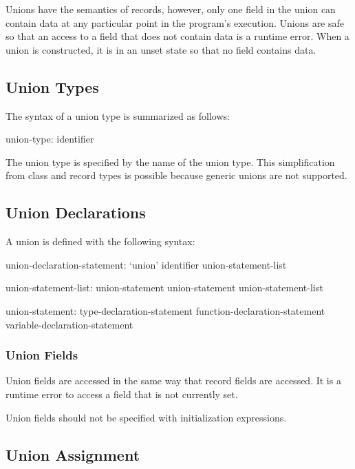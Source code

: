 \label{Unions}

Unions have the semantics of records, however, only one field in the
union can contain data at any particular point in the program's
execution.  Unions are safe so that an access to a field that does not
contain data is a runtime error.  When a union is constructed, it is
in an unset state so that no field contains data.

\subsection{Union Types}
\label{Union_Types}

The syntax of a union type is summarized as follows:
\begin{syntax}
union-type:
  identifier
\end{syntax}
The union type is specified by the name of the union type.  This
simplification from class and record types is possible because generic
unions are not supported.

\subsection{Union Declarations}
\label{Union_Declarations}

A union is defined with the following syntax:
\begin{syntax}
union-declaration-statement:
  `union' identifier { union-statement-list }

union-statement-list:
  union-statement
  union-statement union-statement-list

union-statement:
  type-declaration-statement
  function-declaration-statement
  variable-declaration-statement
\end{syntax}

\subsubsection{Union Fields}
\label{Union_Fields}

Union fields are accessed in the same way that record fields are
accessed.  It is a runtime error to access a field that is not
currently set.

Union fields should not be specified with initialization expressions.

\subsection{Union Assignment}
\label{Union_Assignment}

